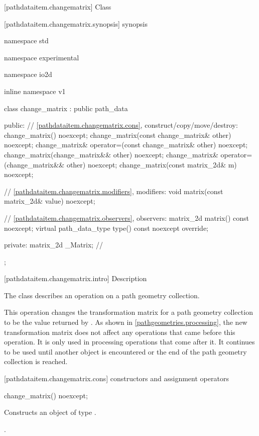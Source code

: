  [pathdataitem.changematrix] {Class }

 [pathdataitem.changematrix.synopsis] { synopsis}

\begin{codeblock}
namespace std { namespace experimental { namespace io2d { inline namespace v1 {
  class change_matrix : public path_data {
  public:
    // \ref{pathdataitem.changematrix.cons}, construct/copy/move/destroy:
    change_matrix() noexcept;
    change_matrix(const change_matrix& other) noexcept;
    change_matrix& operator=(const change_matrix& other) noexcept;
    change_matrix(change_matrix&& other) noexcept;
    change_matrix& operator=(change_matrix&& other) noexcept;
    change_matrix(const matrix_2d& m) noexcept;

    // \ref{pathdataitem.changematrix.modifiers}, modifiers:
    void matrix(const matrix_2d& value) noexcept;

    // \ref{pathdataitem.changematrix.observers}, observers:
    matrix_2d matrix() const noexcept;
    virtual path_data_type type() const noexcept override;
    
  private:
    matrix_2d _Matrix; // \expos
  };
} } } }
\end{codeblock}

 [pathdataitem.changematrix.intro] { Description}

\pnum
{}
The class  describes an operation on a path geometry collection.

\pnum
This operation changes the transformation matrix for a path geometry collection to be the value returned by . As shown in \ref{pathgeometries.processing}, the new transformation matrix does not affect any operations that came before this operation. It is only used in processing operations that come after it. It continues to be used until another  object is encountered or the end of the path geometry collection is reached.

 [pathdataitem.changematrix.cons] { constructors and assignment operators}

\begin{itemdecl}
    change_matrix() noexcept;
\end{itemdecl}
\begin{itemdescr}
	\pnum
	\effects
	Constructs an object of type .
	
	\pnum
	\postconditions
	.
\end{itemdescr}

